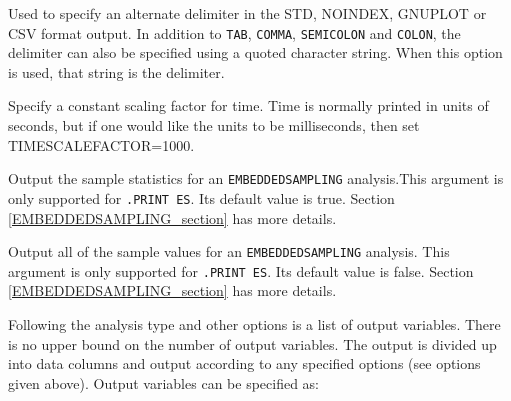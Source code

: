 \begin{Command}
\begin{Arguments}
Used to specify an alternate delimiter in the STD, NOINDEX, GNUPLOT or CSV format
output.  In addition to \texttt{TAB}, \texttt{COMMA}, \texttt{SEMICOLON} and 
\texttt{COLON}, the delimiter can also be specified using a quoted 
character string.  When this option is used, that string is the delimiter.


Specify a constant scaling factor for time.  Time is normally printed in
units of seconds, but if one would like the units to be milliseconds,
then set TIMESCALEFACTOR=1000.

Output the sample statistics for an \texttt{EMBEDDEDSAMPLING}
analysis.This argument is only supported for \texttt{.PRINT ES}.
Its default value is true.  Section \ref{EMBEDDEDSAMPLING_section}
has more details.

Output all of the sample values for an \texttt{EMBEDDEDSAMPLING}
analysis.  This argument is only supported for \texttt{.PRINT ES}.
Its default value is false.  Section \ref{EMBEDDEDSAMPLING_section}
has more details.


Following the analysis type and other options is a list of output
variables. There is no upper bound on the number of output variables.
The output is divided up into data columns and output according to any
specified options (see options given above).  Output variables can be
specified as:


\end{Arguments}
\end{Command}
